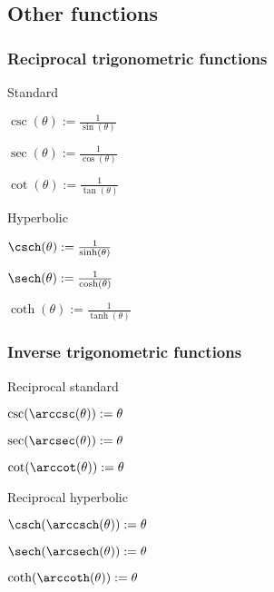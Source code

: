 
\subsection{Other functions}

\subsubsection{Reciprocal trigonometric functions}

Standard

$\csc (\theta ):=\frac{1}{\sin (\theta )}$

$\sec (\theta ):=\frac{1}{\cos (\theta )}$

$\cot (\theta ):=\frac{1}{\tan (\theta )}$

Hyperbolic

$\csch (\theta ):=\frac{1}{\sinh (\theta )}$

$\sech (\theta ):=\frac{1}{\cosh (\theta )}$

$\coth (\theta ):=\frac{1}{\tanh (\theta )}$

\subsubsection{Inverse trigonometric functions}

Reciprocal standard

$\csc (\arccsc (\theta )):=\theta $

$\sec (\arcsec (\theta )):=\theta $

$\cot (\arccot (\theta )):=\theta $

Reciprocal hyperbolic

$\csch (\arccsch (\theta )):=\theta $

$\sech (\arcsech (\theta )):=\theta $

$\coth (\arccoth (\theta )):=\theta $

